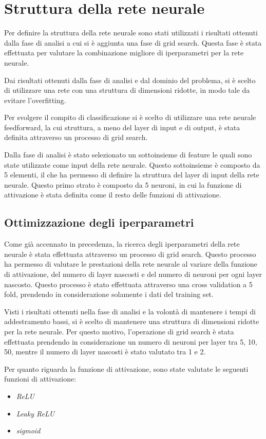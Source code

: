 \section{Struttura della rete neurale}
Per definire la struttura della rete neurale sono stati utilizzati i risultati
ottenuti dalla fase di analisi a cui si è aggiunta una fase di grid search. Questa
fase è stata effettuata per valutare la combinazione migliore di iperparametri
per la rete neurale.

Dai risultati ottenuti dalla fase di analisi e dal dominio del problema, si è
scelto di utilizzare una rete con una struttura di dimensioni ridotte, in modo
tale da evitare l'overfitting.

Per svolgere il compito di classificazione si è scelto di utilizzare una rete
neurale feedforward, la cui struttura, a meno del layer di input e di output, è
stata definita attraverso un processo di grid search.

Dalla fase di analisi è stato selezionato un sottoinsieme di feature le quali
sono state utilizzate come input della rete neurale. Questo sottoinsieme è
composto da 5 elementi, il che ha permesso di definire la struttura del layer di
input della rete neurale. Questo primo strato è composto da 5 neuroni, in cui la
funzione di attivazione è stata definita come il resto delle funzioni di attivazione.
\subsection*{Ottimizzazione degli iperparametri}
Come già accennato in precedenza, la ricerca degli iperparametri della rete neurale
è stata effettuata attraverso un processo di grid search. Questo processo ha
permesso di valutare le prestazioni della rete neurale al variare della funzione
di attivazione, del numero di layer nascosti e del numero di neuroni per ogni
layer nascosto. Questo processo è stato effettuata attraverso una cross
validation a 5 fold, prendendo in considerazione solamente i dati del training set.

Visti i risultati ottenuti nella fase di analisi e la volontà di mantenere i
tempi di addestramento bassi, si è scelto di mantenere una struttura di dimensioni
ridotte per la rete neurale. Per questo motivo, l'operazione di grid search è
stata effettuata prendendo in considerazione un numero di neuroni per layer
tra 5, 10, 50, mentre il numero di layer nascosti è stato valutato tra 1 e 2.

Per quanto riguarda la funzione di attivazione, sono state valutate le seguenti
funzioni di attivazione:
\begin{itemize}
    \item \textit{ReLU}
    \item \textit{Leaky ReLU}
    \item \textit{sigmoid}
\end{itemize}

